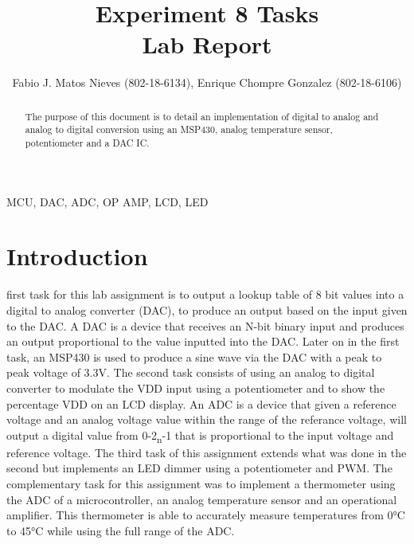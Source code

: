 \documentclass[journal]{IEEEtran}
\begin{document}
\title{Experiment 8 Tasks\\ Lab Report} \author{Fabio J. Matos
  Nieves (802-18-6134), Enrique Chompre Gonzalez (802-18-6106)}
\maketitle
\begin{abstract}
  The purpose of this document is to detail an implementation of digital to analog and analog to digital conversion using an MSP430, analog temperature sensor, potentiometer and a DAC IC.
\end{abstract}
\begin{IEEEkeywords}
  MCU, DAC, ADC, OP AMP, LCD, LED
\end{IEEEkeywords}
\IEEEpeerreviewmaketitle
\section{Introduction}
 first task for this lab assignment is to output a lookup table of 8 bit values into a digital to analog converter (DAC), to  produce an output based on the input given to the DAC. A DAC is a device that receives an N-bit binary input and produces an output proportional to the value inputted into the DAC. Later on in the first task, an MSP430  is used to produce a sine wave via the DAC with a peak to peak voltage of 3.3\si{\V}. The second task consists of using an analog to digital converter to modulate the VDD input using a potentiometer and to show the percentage VDD on an LCD display. An ADC is a device that given a reference voltage and an analog voltage value within the range of the referance voltage, will output a digital value from 0-2\textsubscript{n}-1 that is proportional to the input voltage and reference voltage. The third task of this assignment extends what was done in the second but implements an LED dimmer using a potentiometer and PWM. The complementary task for this assignment was to implement a thermometer using the ADC of a microcontroller, an analog temperature sensor and an operational amplifier. This thermometer is able to accurately measure temperatures from 0\si{\celsius} to 45\si{\celsius} while using the full range of the ADC.
\end{document}
